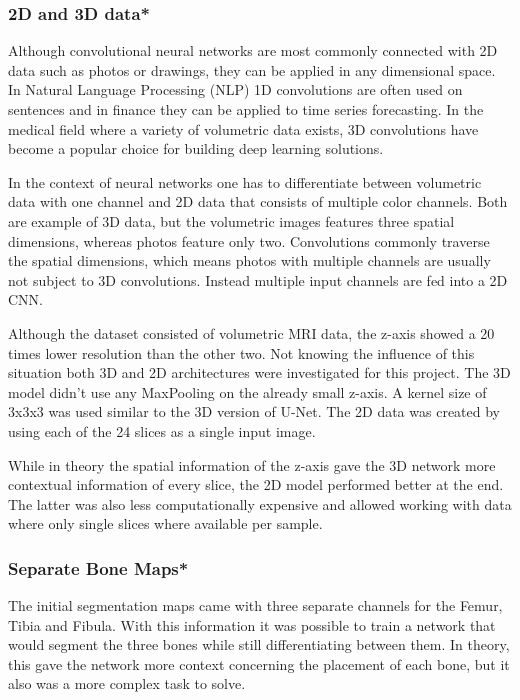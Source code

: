 \subsubsection{2D and 3D data*}

Although convolutional neural networks are most commonly connected with 2D data such as photos or drawings, they can be applied in any dimensional space. In Natural Language Processing (NLP) 1D convolutions are often used on sentences and in finance they can be applied to time series forecasting. In the medical field where a variety of volumetric data exists, 3D convolutions have become a popular choice for building deep learning solutions.

In the context of neural networks one has to differentiate between volumetric data with one channel and 2D data that consists of multiple color channels. Both are example of 3D data, but the volumetric images features three spatial dimensions, whereas photos feature only two. Convolutions commonly traverse the spatial dimensions, which means photos with multiple channels are usually not subject to 3D convolutions. Instead multiple input channels are fed into a 2D CNN.

Although the dataset consisted of volumetric MRI data, the z-axis showed a 20 times lower resolution than the other two. Not knowing the influence of this situation both 3D and 2D architectures were investigated for this project. The 3D model didn't use any MaxPooling on the already small z-axis. A kernel size of 3x3x3 was used similar to the 3D version of U-Net. The 2D data was created by using each of the 24 slices as a single input image. 

While in theory the spatial information of the z-axis gave the 3D network more contextual information of every slice, the 2D model performed better at the end. The latter was also less computationally expensive and allowed working with data where only single slices where available per sample.

\subsubsection{Separate Bone Maps*}

The initial segmentation maps came with three separate channels for the Femur, Tibia and Fibula. With this information it was possible to train a network that would segment the three bones while still differentiating between them. In theory, this gave the network more context concerning the placement of each bone, but it also was a more complex task to solve. 

